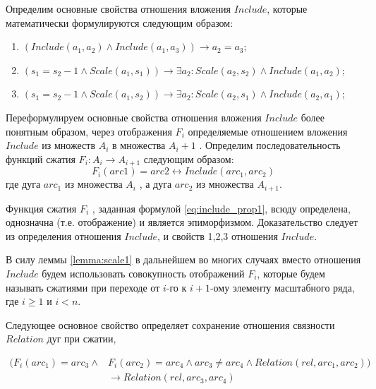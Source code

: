 Определим основные свойства отношения вложения  $Include$,  которые математически формулируются следующим образом:
\begin{enumerate}
\item $(Include ( a_1, a_2) \wedge  Include ( a_1, a_3) ) \to a_2 = a_3$; %
\item $( s_1  = s_2 - 1 \wedge  Scale(a_1, s_1)) \to \exists a_2 : Scale(a_2, s_2) \wedge Include(a_1, a_2)$; %
\item $(s_1  = s_2 - 1 \wedge Scale(a_1, s_2)) \to \exists a_2: Scale(a_2, s_1)\wedge Include(a_2, a_1)$; %
\end{enumerate}
Переформулируем  основные свойства отношения вложения $Include$  более понятным образом, через отображения  $F_i$  определяемые отношением вложения  $Include$  из  множеств  $A_i$ в множества $A_i+1$ .     
Определим последовательность функций сжатия  $F_i : A_i \to A_{i+1}$ следующим образом: 
\begin{equation}
F_i(arc1) = arc2 \leftrightarrow Include ( arc_1, arc_2 )
\label{eq:include_prop1}
\end{equation}
где  дуга  $arc_1$  из множества $A_i$  , а  дуга  $arc_2$  из множества $A_{i+1}$.

\begin{lemma}
Функция сжатия  $F_i$ , заданная формулой \ref{eq:include_prop1},   всюду определена, однозначна (т.е. отображение)  и   является эпиморфизмом.
Доказательство следует из определения отношения $Include$,  и свойств 1,2,3 отношения $Include$.
\label{lemma:scale1}
\end{lemma}


\begin{remark}
В силу леммы \ref{lemma:scale1}  в дальнейшем во многих случаях вместо отношения $Include$  будем использовать совокупность отображений  $F_i$, которые будем называть сжатиями при переходе от  $i$-го  к $i+1$-ому  элементу масштабного ряда, где  $i \geq 1$ и  $i < n$.
\end{remark}

Следующее основное свойство определяет сохранение отношения связности $Relation$ дуг при сжатии, 

\begin{equation}
\begin{split}
(F_i (arc_1) = arc_3\wedge & F_i (arc_2) = arc_4 \wedge arc_3 \neq  arc_4   \wedge  Relation(rel, arc_1, arc_2)) \\
& \to Relation(rel, arc_3, arc_4)
\end{split}
\end{equation}


